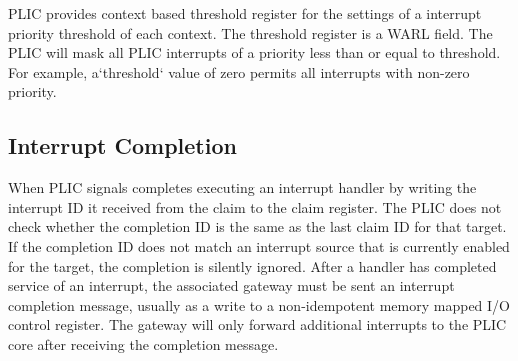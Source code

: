 PLIC provides context based threshold register for the settings of a interrupt priority threshold of each context. The threshold register is a WARL field. The PLIC will mask all PLIC interrupts of a priority less than or equal to threshold. For example, a`threshold` value of zero permits all interrupts with non-zero priority.

\subsection{Interrupt Completion}
When PLIC signals completes executing an interrupt handler by writing the interrupt ID it received from the claim to the claim register. The PLIC does not check whether the completion ID is the same as the last claim ID for that target. If the completion ID does not match an interrupt source that is currently enabled for the target, the completion is silently ignored. After a handler has completed service of an interrupt, the associated gateway must be sent an interrupt completion message, usually as a write to a non-idempotent memory mapped I/O control register. The gateway will only forward additional interrupts to the PLIC core after receiving the
completion message.







